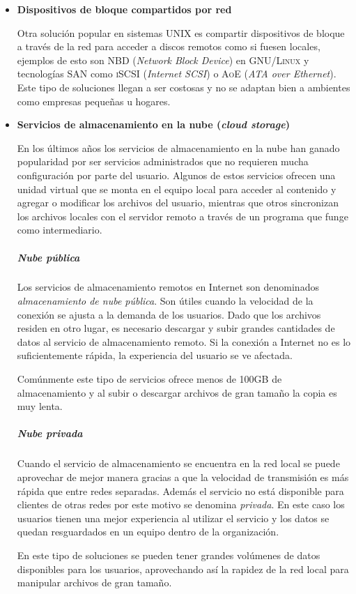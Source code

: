 \begin{itemize}
\newpage
      \item \textbf{Dispositivos de bloque compartidos por red}

Otra soluci\'{o}n popular en sistemas \textsc{UNIX} es compartir dispositivos de bloque a trav\'{e}s de la red para acceder a discos remotos como si fuesen locales, ejemplos de esto son \textsc{NBD} (\textit{Network Block Device}) en \textsc{GNU/Linux} y tecnolog\'{i}as \textsc{SAN} como \textsc{iSCSI} (\textit{Internet SCSI}) o \textsc{AoE} (\textit{ATA over Ethernet}). Este tipo de soluciones llegan a ser costosas y no se adaptan bien a ambientes como empresas peque\~{n}as u hogares.

      \item \textbf{Servicios de almacenamiento en la nube (\emph{cloud storage})}

En los \'{u}ltimos a\~{n}os los servicios de almacenamiento en la nube han ganado popularidad por ser servicios administrados que no requieren mucha configuraci\'{o}n por parte del usuario. Algunos de estos servicios ofrecen una unidad virtual que se monta en el equipo local para acceder al contenido y agregar o modificar los archivos del usuario, mientras que otros sincronizan los archivos locales con el servidor remoto a trav\'{e}s de un programa que funge como intermediario.

        \subparagraph*{Nube p\'{u}blica \\}

Los servicios de almacenamiento remotos en Internet son denominados \emph{almacenamiento de nube p\'{u}blica}. Son \'{u}tiles cuando la velocidad de la conexi\'{o}n se ajusta a la demanda de los usuarios. Dado que los archivos residen en otro lugar, es necesario descargar y subir grandes cantidades de datos al servicio de almacenamiento remoto. Si la conexi\'{o}n a Internet no es lo suficientemente r\'{a}pida, la experiencia del usuario se ve afectada.

Com\'{u}nmente este tipo de servicios ofrece menos de 100GB de almacenamiento y al subir o descargar archivos de gran tama\~{n}o la copia es muy lenta.

        \subparagraph*{Nube privada \\}

Cuando el servicio de almacenamiento se encuentra en la red local se puede aprovechar de mejor manera gracias a que la velocidad de transmisi\'{o}n es m\'{a}s r\'{a}pida que entre redes separadas. Adem\'{a}s el servicio no est\'{a} disponible para clientes de otras redes por este motivo se denomina \emph{privada}. En este caso los usuarios tienen una mejor experiencia al utilizar el servicio y los datos se quedan resguardados en un equipo dentro de la organizaci\'{o}n.

En este tipo de soluciones se pueden tener grandes vol\'{u}menes de datos disponibles para los usuarios, aprovechando as\'{i} la rapidez de la red local para manipular archivos de gran tama\~{n}o. %

    \end{itemize}

